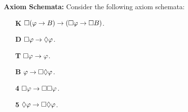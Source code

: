 \documentclass[a4paper, 11pt]{article} %
\begin{document}
\begin{enumerate}[leftmargin=1.2in,itemsep=2pt]
	\item[\bf Axiom Schemata:] Consider the following axiom schemata:\vspace{-.05in}
	      \begin{multicols}{2}
		      \begin{enumerate}
			      \item[\bf K] $\Box(\varphi\rightarrow B)\rightarrow(\Box \varphi\rightarrow\Box B)$.
			      \item[\bf D] $\Box \varphi\rightarrow\Diamond \varphi$.
			      \item[\bf T] $\Box \varphi\rightarrow \varphi$.
			      \item[\bf B] $\varphi\rightarrow\Box\Diamond \varphi$.
			      \item[\bf 4] $\Box \varphi\rightarrow\Box\Box \varphi$.
			      \item[\bf 5] $\Diamond \varphi\rightarrow\Box\Diamond \varphi$.


\end{enumerate}
\end{multicols}
\end{enumerate}
\end{document}
